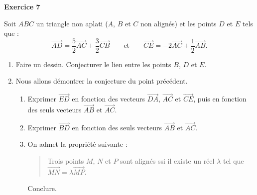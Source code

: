 \documentclass[a4paper,11pt]{article}
\newenvironment{exercice}[1]{%
  \par\bigskip\noindent\textbf{Exercice #1}\par\smallskip\noindent\ignorespaces
}{%
  \par
}
\begin{document}
\begin{exercice}{7}
Soit $ABC$ un triangle non aplati ($A$, $B$ et $C$ non alignés) et les points $D$ et $E$ tels que :
\[
\overrightarrow{AD}=\dfrac52\overrightarrow{AC}+\dfrac32\overrightarrow{CB}
\qquad\text{et}\qquad
\overrightarrow{CE}=-2\overrightarrow{AC}+\dfrac12\overrightarrow{AB}.
\]
\begin{enumerate}[label=\arabic*.]
\item Faire un dessin. Conjecturer le lien entre les points $B$, $D$ et $E$.
\item Nous allons démontrer la conjecture du point précédent.
  \begin{enumerate}[label=\alph*.]
  \item Exprimer $\overrightarrow{ED}$ en fonction des vecteurs $\overrightarrow{DA}$, $\overrightarrow{AC}$ et $\overrightarrow{CE}$, puis en fonction des seuls vecteurs $\overrightarrow{AB}$ et $\overrightarrow{AC}$.
  \item Exprimer $\overrightarrow{BD}$ en fonction des seuls vecteurs $\overrightarrow{AB}$ et $\overrightarrow{AC}$.
  \item On admet la propriété suivante :
  \begin{quote}
  \og Trois points $M$, $N$ et $P$ sont alignés ssi il existe un réel $\lambda$ tel que $\overrightarrow{MN}=\lambda\overrightarrow{MP}$. \fg{}
  \end{quote}
  Conclure.
  \end{enumerate}
\end{enumerate}
\end{exercice}
\end{document}
